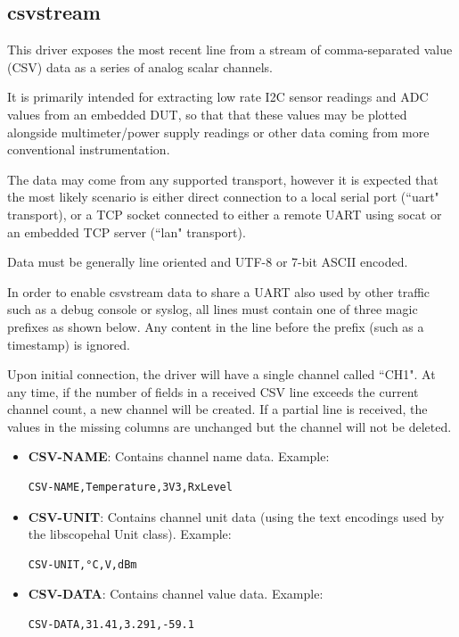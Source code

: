 \subsection{csvstream}

This driver exposes the most recent line from a stream of comma-separated value (CSV) data as a series of analog scalar
channels.

It is primarily intended for extracting low rate I2C sensor readings and ADC values from an embedded DUT, so that that
these values may be plotted alongside multimeter/power supply readings or other data coming from more conventional
instrumentation.

The data may come from any supported transport, however it is expected that the most likely scenario is either direct
connection to a local serial port (``uart" transport), or a TCP socket connected to either a remote UART using socat or
an embedded TCP server (``lan" transport).

Data must be generally line oriented and UTF-8 or 7-bit ASCII encoded.

In order to enable csvstream data to share a UART also used by other traffic such as a debug console or syslog, all
lines must contain one of three magic prefixes as shown below. Any content in the line before the prefix (such as a
timestamp) is ignored.

Upon initial connection, the driver will have a single channel called ``CH1". At any time, if the number of fields in a
received CSV line exceeds the current channel count, a new channel will be created. If a partial line is received, the
values in the missing columns are unchanged but the channel will not be deleted.

\begin{itemize}
\item \textbf{CSV-NAME}: Contains channel name data. Example:
\begin{verbatim}
CSV-NAME,Temperature,3V3,RxLevel
\end{verbatim}

\item \textbf{CSV-UNIT}: Contains channel unit data (using the text encodings used by the libscopehal Unit class). Example:
\begin{verbatim}
CSV-UNIT,°C,V,dBm
\end{verbatim}

\item \textbf{CSV-DATA}: Contains channel value data. Example:
\begin{verbatim}
CSV-DATA,31.41,3.291,-59.1
\end{verbatim}

\end{itemize}
